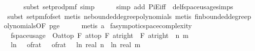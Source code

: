 \begin{isabellebody}
\ \ \ \ \isamarkupfalse%
\ {\isacharparenleft}{\kern0pt}subst\ set{\isacharunderscore}{\kern0pt}prod{\isacharunderscore}{\kern0pt}pmf{\isacharcomma}{\kern0pt}\ simp{\isacharparenright}{\kern0pt}\isanewline
\ \ \ \ \isamarkupfalse%
\ {\isacharparenleft}{\kern0pt}simp\ add{\isacharcolon}{\kern0pt}\ PiE{\isacharunderscore}{\kern0pt}iff\ \ del{\isacharcolon}{\kern0pt}f{}{\isacharunderscore}{\kern0pt}space{\isacharunderscore}{\kern0pt}usage{\isachardot}{\kern0pt}simps{\isacharparenright}{\kern0pt}\isanewline
\ \ \ \ \isamarkupfalse%
\ {\isacharparenleft}{\kern0pt}subst\ set{\isacharunderscore}{\kern0pt}pmf{\isacharunderscore}{\kern0pt}of{\isacharunderscore}{\kern0pt}set{\isacharcomma}{\kern0pt}\ metis\ ne{\isacharunderscore}{\kern0pt}bounded{\isacharunderscore}{\kern0pt}degree{\isacharunderscore}{\kern0pt}polynomials{\isacharcomma}{\kern0pt}\ metis\ fin{\isacharunderscore}{\kern0pt}bounded{\isacharunderscore}{\kern0pt}degree{\isacharunderscore}{\kern0pt}polynomials{\isacharbrackleft}{\kern0pt}OF\ p{\isacharunderscore}{\kern0pt}ge{\isacharunderscore}{\kern0pt}{}{\isacharbrackright}{\kern0pt}{\isacharparenright}{\kern0pt}\isanewline
\ \ \ \ \isamarkupfalse%
\ {\isacharparenleft}{\kern0pt}metis\ a{\isacharparenright}{\kern0pt}\isanewline
{}\isamarkupfalse%
%
\endisatagproof
{\isafoldproof}%
%
\isadelimproof
\isanewline
%
\endisadelimproof
\isanewline
{}\isamarkupfalse%
\ f{}{\isacharunderscore}{\kern0pt}asympotic{\isacharunderscore}{\kern0pt}space{\isacharunderscore}{\kern0pt}complexity{\isacharcolon}{\kern0pt}\isanewline
\ \ {\isachardoublequoteopen}f{}{\isacharunderscore}{\kern0pt}space{\isacharunderscore}{\kern0pt}usage\ {\isasymin}\ O{\isacharbrackleft}{\kern0pt}at{\isacharunderscore}{\kern0pt}top\ {\isasymtimes}\isactrlsub F\ at{\isacharunderscore}{\kern0pt}top\ {\isasymtimes}\isactrlsub F\ at{\isacharunderscore}{\kern0pt}right\ {}\ {\isasymtimes}\isactrlsub F\ at{\isacharunderscore}{\kern0pt}right\ {}{\isacharbrackright}{\kern0pt}{\isacharparenleft}{\kern0pt}{\isasymlambda}\ {\isacharparenleft}{\kern0pt}n{\isacharcomma}{\kern0pt}\ m{\isacharcomma}{\kern0pt}\ {\isasymepsilon}{\isacharcomma}{\kern0pt}\ {\isasymdelta}{\isacharparenright}{\kern0pt}{\isachardot}{\kern0pt}\ \isanewline
\ \ {\isacharparenleft}{\kern0pt}ln\ {\isacharparenleft}{\kern0pt}{}\ {\isacharslash}{\kern0pt}\ of{\isacharunderscore}{\kern0pt}rat\ {\isasymepsilon}{\isacharparenright}{\kern0pt}{\isacharparenright}{\kern0pt}\ {\isacharslash}{\kern0pt}\ {\isacharparenleft}{\kern0pt}of{\isacharunderscore}{\kern0pt}rat\ {\isasymdelta}{\isacharparenright}{\kern0pt}\ {\isacharasterisk}{\kern0pt}\ {\isacharparenleft}{\kern0pt}ln\ {\isacharparenleft}{\kern0pt}real\ n{\isacharparenright}{\kern0pt}\ {\isacharplus}{\kern0pt}\ ln\ {\isacharparenleft}{\kern0pt}real\ m{\isacharparenright}{\kern0pt}{\isacharparenright}{\kern0pt}{\isacharparenright}{\kern0pt}{\isachardoublequoteclose}\isanewline

\end{isabellebody}
